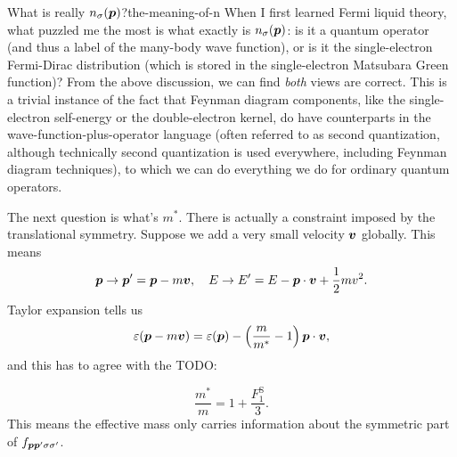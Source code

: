 \documentclass[hyperref, a4paper]{article}
\begin{document}
\begin{theorybox}{What is really $n_{\sigma}(\vb*{p})$?}{the-meaning-of-n}
    When I first learned Fermi liquid theory, 
    what puzzled me the most is 
    what exactly is $n_{\sigma}(\vb*{p})$:
    is it a quantum operator
    (and thus a label of the many-body wave function), 
    or is it the single-electron Fermi-Dirac distribution
    (which is stored in the single-electron Matsubara Green function)?
    From the above discussion, 
    we can find \emph{both} views are correct.
    This is a trivial instance of the fact that 
    Feynman diagram components, like the single-electron self-energy 
    or the double-electron kernel, 
    do have counterparts in the wave-function-plus-operator language
    (often referred to as second quantization, 
    although technically second quantization is used everywhere, 
    including Feynman diagram techniques),
    to which we can do everything we do for ordinary quantum operators.
\end{theorybox}

The next question is what's $m^*$.
There is actually a constraint imposed by 
the translational symmetry. 
Suppose we add a very small velocity $\vb*{v}$ globally. 
This means 
\begin{equation}
    \vb*{p} \to \vb*{p}' = \vb*{p} - m \vb*{v}, \quad 
    E \to E' = E - \vb*{p} \cdot \vb*{v} + \frac{1}{2} m v^2.
\end{equation}
Taylor expansion tells us
\begin{equation}
    \varepsilon(\vb*{p} - m \vb*{v}) = 
    \varepsilon(\vb*{p}) - \left(
        \frac{m}{m^*} - 1
    \right) \vb*{p} \cdot \vb*{v}, 
\end{equation}
and this has to agree with the 
TODO: 

\begin{equation}
    \frac{m^*}{m} = 1 + \frac{F^{\text{S}}_1}{3}.
\end{equation}
This means the effective mass only carries information about 
the symmetric part of $f_{\vb*{p} \vb*{p}' \sigma \sigma'}$.
\end{document}
